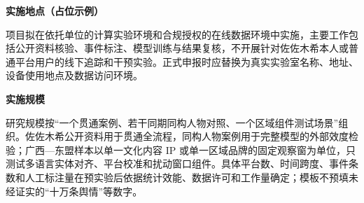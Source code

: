 \GXNSFBodyText

\noindent\textbf{实施地点（占位示例）}\par
项目拟在依托单位的计算实验环境和合规授权的在线数据环境中实施，主要工作包括公开资料核验、事件标注、模型训练与结果复核，不开展针对佐佐木希本人或普通平台用户的线下追踪和干预实验。正式申报时应替换为真实实验室名称、地址、设备使用地点及数据访问环境。

\noindent\textbf{实施规模}\par
研究规模按“一个贯通案例、若干同期同构人物对照、一个区域组件测试场景”组织。佐佐木希公开资料用于贯通全流程，同构人物案例用于完整模型的外部效度检验；广西—东盟样本以单一文化内容 IP 或单一区域品牌的固定观察窗为单位，只测试多语言实体对齐、平台校准和扰动窗口组件。具体平台数、时间跨度、事件条数和人工标注量在预实验后依据统计效能、数据许可和工作量确定；模板不预填未经证实的“十万条舆情”等数字。
